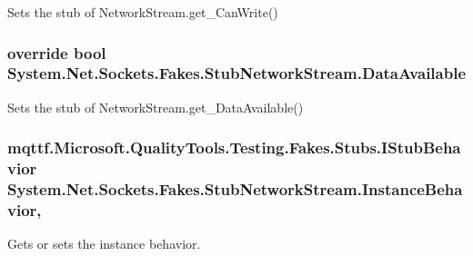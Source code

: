 Sets the stub of Network\-Stream.\-get\-\_\-\-Can\-Write()

\hypertarget{class_system_1_1_net_1_1_sockets_1_1_fakes_1_1_stub_network_stream_af8bd9c5a7466f14ad91980e1b9cd5183}{
\subsubsection[{Data\-Available}]{\setlength{\rightskip}{0pt plus 5cm}override bool System.\-Net.\-Sockets.\-Fakes.\-Stub\-Network\-Stream.\-Data\-Available\hspace{0.3cm}{\ttfamily [get]}}}\label{class_system_1_1_net_1_1_sockets_1_1_fakes_1_1_stub_network_stream_af8bd9c5a7466f14ad91980e1b9cd5183}


Sets the stub of Network\-Stream.\-get\-\_\-\-Data\-Available()

\hypertarget{class_system_1_1_net_1_1_sockets_1_1_fakes_1_1_stub_network_stream_a5eb8f4b229b6cc46d1ef6fef8da30ed6}{
\subsubsection[{Instance\-Behavior}]{\setlength{\rightskip}{0pt plus 5cm}mqttf.\-Microsoft.\-Quality\-Tools.\-Testing.\-Fakes.\-Stubs.\-I\-Stub\-Behavior System.\-Net.\-Sockets.\-Fakes.\-Stub\-Network\-Stream.\-Instance\-Behavior\hspace{0.3cm}{\ttfamily [get]}, {\ttfamily [set]}}}\label{class_system_1_1_net_1_1_sockets_1_1_fakes_1_1_stub_network_stream_a5eb8f4b229b6cc46d1ef6fef8da30ed6}


Gets or sets the instance behavior.

